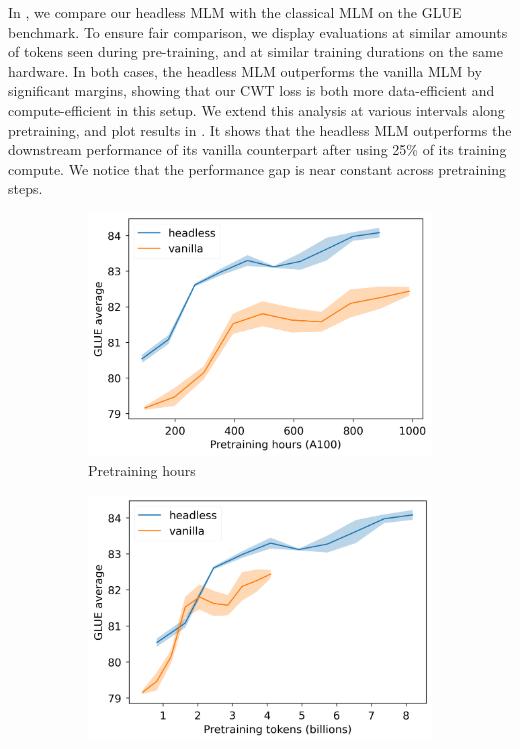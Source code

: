 In , we compare our headless MLM with the classical MLM on the GLUE benchmark. To ensure fair comparison, we display evaluations at similar amounts of tokens seen during pre-training, and at similar training durations on the same hardware. In both cases, the headless MLM outperforms the vanilla MLM by significant margins, showing that our CWT loss is both more data-efficient and compute-efficient in this setup.
%
We extend this analysis at various intervals along pretraining, and plot results in . It shows that the headless MLM outperforms the downstream performance of its vanilla counterpart after using 25\% of its training compute. We notice that the performance gap is near constant across pretraining steps.

\begin{figure}
    \centering
    \begin{subfigure}[b]{0.41\columnwidth}
         \includegraphics[width=\linewidth]{sources/part_2/headless/imgs/bert_compare_hours_p13.png}
         \caption{Pretraining hours}
         \label{fig:bert_compare_hours}
    \end{subfigure}
    \begin{subfigure}[b]{0.40\columnwidth}
         \includegraphics[width=\linewidth]{sources/part_2/headless/imgs/bert_compare_tokens_p13.png}

\end{subfigure}
\end{figure}
